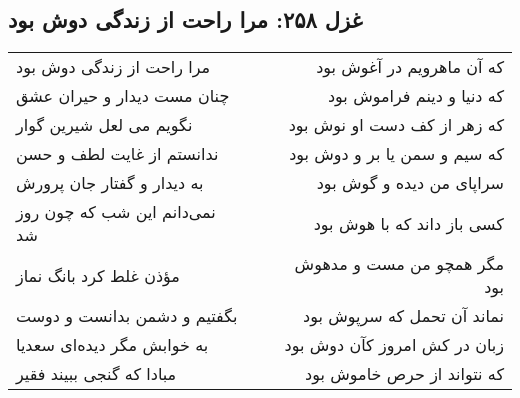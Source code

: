 \begin{center}
\section*{غزل ۲۵۸: مرا راحت از زندگی دوش بود}
\label{sec:258}
\begin{longtable}{l p{0.5cm} r}
مرا راحت از زندگی دوش بود
&&
که آن ماهرویم در آغوش بود
\\
چنان مست دیدار و حیران عشق
&&
که دنیا و دینم فراموش بود
\\
نگویم می لعل شیرین گوار
&&
که زهر از کف دست او نوش بود
\\
ندانستم از غایت لطف و حسن
&&
که سیم و سمن یا بر و دوش بود
\\
به دیدار و گفتار جان پرورش
&&
سراپای من دیده و گوش بود
\\
نمی‌دانم این شب که چون روز شد
&&
کسی باز داند که با هوش بود
\\
مؤذن غلط کرد بانگ نماز
&&
مگر همچو من مست و مدهوش بود
\\
بگفتیم و دشمن بدانست و دوست
&&
نماند آن تحمل که سرپوش بود
\\
به خوابش مگر دیده‌ای سعدیا
&&
زبان در کش امروز کآن دوش بود
\\
مبادا که گنجی ببیند فقیر
&&
که نتواند از حرص خاموش بود
\\
\end{longtable}
\end{center}
